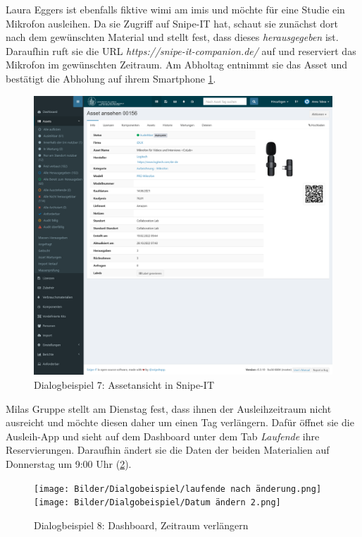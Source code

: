 \newpage
Laura Eggers ist ebenfalls fiktive \ac{wimi} am \ac{imis} und möchte für eine
Studie ein Mikrofon ausleihen. Da sie Zugriff auf Snipe-IT hat, schaut sie
zunächst dort nach dem gewünschten Material und stellt fest, dass dieses
\textit{herausgegeben} ist. Daraufhin ruft sie die URL
\textit{https://snipe-it-companion.de/} auf und reserviert das Mikrofon im
gewünschten Zeitraum. Am Abholtag entnimmt sie das Asset und bestätigt die
Abholung auf ihrem Smartphone \ref{fig:georg5}. 
\begin{figure}[h]
    \centering
    \includegraphics[scale=0.19]{Bilder/snipeit.png}
    \caption{Dialogbeispiel 7: Assetansicht in Snipe-IT}\label{fig:georg5}
\end{figure}


Milas Gruppe stellt am Dienstag fest, dass ihnen der Ausleihzeitraum nicht
ausreicht und möchte diesen daher um einen Tag verlängern. Dafür öffnet sie die
Ausleih-App und sieht auf dem Dashboard unter dem Tab \textit{Laufende} ihre
Reservierungen. Daraufhin ändert sie die Daten der beiden Materialien auf
Donnerstag um 9:00 Uhr (\ref{fig:andern}).
\begin{figure}[h]
    \centering
    \texttt{[image: Bilder/Dialgobeispiel/laufende nach änderung.png]}\hspace{1em}
    \texttt{[image: Bilder/Dialgobeispiel/Datum ändern 2.png]}\hspace{1em}
    \caption{Dialogbeispiel 8: Dashboard, Zeitraum verlängern}\label{fig:andern}
\end{figure}

